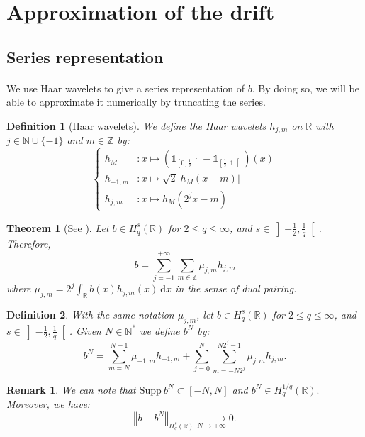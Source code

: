 \documentclass{article}[12pt]
\newtheorem{defi}{Definition}[section]
\newtheorem{theo}{Theorem}[section]
\newtheorem{rem}{Remark}[section]
\newcommand{\norme}[1]{\left\Vert #1\right\Vert}
\newcommand{\R}{\mathbb{R}}
\newcommand{\Z}{\mathbb{Z}}
\newcommand{\N}{\mathbb{N}}
\newcommand{\di}{\mathrm{d}}
\begin{document}
\section{Approximation of the drift}
    \subsection{Series representation}
    \paragraph{}
    We use Haar wavelets to give a series representation of $b$. By doing so, we will be able to approximate it numerically by truncating the series.
    
    \begin{defi}[Haar wavelets]
        We define the Haar wavelets $h_{j,m}$ on $\R$ with $j\in\N\cup\{-1\}$ and $m\in\Z$ by:
        $$\begin{cases}
        h_M&:x\longmapsto\left(\mathds{1}_{\left[0,\frac{1}{2}\right[}-\mathds{1}_{\left[\frac{1}{2},1\right[}\right)(x)\\ h_{-1,m}&:x\longmapsto\sqrt{2}|h_M(x-m)|\\
        h_{j,m}&:x\longmapsto h_M(2^jx-m) 
        \end{cases}$$
    \end{defi}
    
    \begin{theo}[See \cite{Iss-Rus-2200}]
        Let $b\in H^s_q(\R)$ for $2\leq q \leq \infty$, and $s\in\left]-\frac{1}{2},\frac{1}{q}\right[$. Therefore,
        \begin{equation}
        b = \sum_{j=-1}^{+\infty}\sum_{m\in\Z}\mu_{j,m}h_{j,m}
        \end{equation}
        where $\mu_{j,m} = 2^j\int_{\R}b(x)h_{j,m}(x)\ \di x$ in the sense of dual pairing.
    \end{theo}

    \begin{defi}
        With the same notation $\mu_{j,m} $, let $b\in H^s_q(\R)$ for $2\leq q \leq \infty$, and $s\in\left]-\frac{1}{2},\frac{1}{q}\right[$. Given $N\in\N^*$ we define $b^N$ by:
        \begin{equation}
        b^N = \sum_{m=N}^{N-1}\mu_{-1,m}h_{-1,m}+\sum_{j=0}^{N}\sum_{m=-N2^j}^{N2^j-1}\mu_{j,m}h_{j,m}.
        \end{equation}
    \end{defi}

    \begin{rem}
        We can note that $\mathrm{Supp}\ b^N\subset [-N,N]$ and $ b^N\in H_q^{1/q}(\R).$ Moreover, we have: $$\norme{b-b^N}_{H_q^s(\R)} \underset{N\rightarrow+\infty}{\longrightarrow} 0.$$
    \end{rem}
\end{document}
